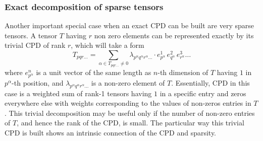 \subsubsection{Exact decomposition of sparse tensors}
Another important special case when an exact CPD can be built are very sparse 
tensors. A tensor $T$ having $r$ non zero elements can be represented exactly 
by its trivial CPD of rank $r$, which will take a form
%
\begin{equation}
T_{pqr\ldots} = \sum_{\alpha \in T_{pqr\ldots} \neq 0} \lambda_{p^\alpha 
q^{\alpha} 
r^{\alpha}\ldots} \cdot e^{1}_{p^{\alpha}} \, e^{2}_{q^\alpha} \, 
e^{3}_{r^\alpha} \ldots
\label{eq:trivial_cpd_dec}
\end{equation}
%
where $e^{n}_{p^{\alpha}}$ is a unit vector of the same length as $n$-th 
dimension of $T$ having $1$ in $p^{\alpha}$-th position, and 
$\lambda_{p^{\alpha}q^{\alpha}r^{\alpha}\ldots}$ is a non-zero element of 
$T$. Essentially, CPD in this case is a weighted sum of rank-1 tensors having 
$1$ in a specific entry and 
zeros everywhere else with 
weights corresponding to the values of non-zeros entries in $T$. This 
trivial decomposition may be useful only if the number of non-zero entries of 
$T$, and hence the rank of the CPD, is small. The particular way this trivial 
CPD is built shows an intrinsic connection of the CPD and sparsity.

